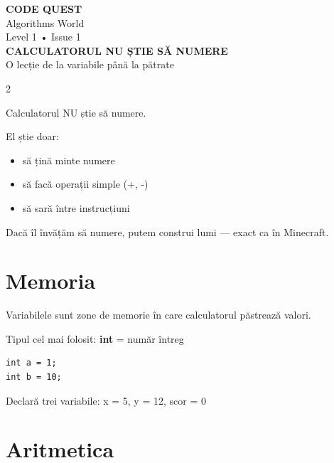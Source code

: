 \documentclass[11pt]{article}
\begin{document}
\begin{center}
{\Huge \textbf{CODE QUEST}}\\
Algorithms World\\
Level 1 • Issue 1\\[10pt]

{\huge \textbf{CALCULATORUL NU ȘTIE SĂ NUMERE}}\\
O lecție de la variabile până la pătrate
\end{center}

\vspace{0.5cm}

\begin{multicols}{2}

\begin{missionbox}
Calculatorul NU știe să numere.

El știe doar:
\begin{itemize}
\item să țină minte numere
\item să facă operații simple (+, -)
\item să sară între instrucțiuni
\end{itemize}

Dacă îl învățăm să numere, putem construi lumi — exact ca în Minecraft.
\end{missionbox}

\section*{Memoria}

\begin{theorybox}
Variabilele sunt zone de memorie în care calculatorul păstrează valori.

Tipul cel mai folosit:
\textbf{int} = număr întreg
\end{theorybox}

\begin{examplebox}
\begin{lstlisting}
int a = 1;
int b = 10;
\end{lstlisting}
\end{examplebox}

\begin{trybox}
Declară trei variabile:
x = 5, y = 12, scor = 0
\end{trybox}

\section*{Aritmetica}


\end{multicols}
\end{document}
